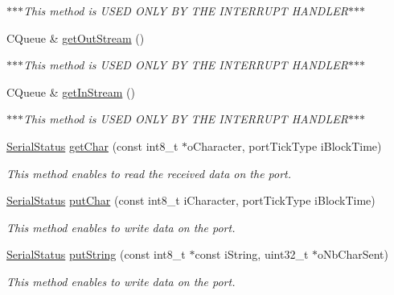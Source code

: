 \begin{DoxyCompactItemize}
\begin{DoxyCompactList}\small\item\em $\ast$$\ast$$\ast$\-This method is \-U\-S\-E\-D \-O\-N\-L\-Y \-B\-Y \-T\-H\-E \-I\-N\-T\-E\-R\-R\-U\-P\-T \-H\-A\-N\-D\-L\-E\-R$\ast$$\ast$$\ast$ \end{DoxyCompactList}\item 
\hypertarget{class_async_serial_port1_ac971fccf2a2885233436f7685ee964cd}{\-C\-Queue \& \hyperlink{class_async_serial_port1_ac971fccf2a2885233436f7685ee964cd}{get\-Out\-Stream} ()}\label{class_async_serial_port1_ac971fccf2a2885233436f7685ee964cd}

\begin{DoxyCompactList}\small\item\em $\ast$$\ast$$\ast$\-This method is \-U\-S\-E\-D \-O\-N\-L\-Y \-B\-Y \-T\-H\-E \-I\-N\-T\-E\-R\-R\-U\-P\-T \-H\-A\-N\-D\-L\-E\-R$\ast$$\ast$$\ast$ \end{DoxyCompactList}\item 
\hypertarget{class_async_serial_port1_a61f0414477f9979a4aae765f9cd2d9e3}{\-C\-Queue \& \hyperlink{class_async_serial_port1_a61f0414477f9979a4aae765f9cd2d9e3}{get\-In\-Stream} ()}\label{class_async_serial_port1_a61f0414477f9979a4aae765f9cd2d9e3}

\begin{DoxyCompactList}\small\item\em $\ast$$\ast$$\ast$\-This method is \-U\-S\-E\-D \-O\-N\-L\-Y \-B\-Y \-T\-H\-E \-I\-N\-T\-E\-R\-R\-U\-P\-T \-H\-A\-N\-D\-L\-E\-R$\ast$$\ast$$\ast$ \end{DoxyCompactList}\item 
\hyperlink{_serial_type_8h_a71c113451bfafdaf5fcabcd807acd480}{\-Serial\-Status} \hyperlink{class_async_serial_port1_abf7bce398cb06b5368f7a617bcbdf857}{get\-Char} (const int8\-\_\-t $\ast$o\-Character, port\-Tick\-Type i\-Block\-Time)
\begin{DoxyCompactList}\small\item\em \-This method enables to read the received data on the port. \end{DoxyCompactList}\item 
\hyperlink{_serial_type_8h_a71c113451bfafdaf5fcabcd807acd480}{\-Serial\-Status} \hyperlink{class_async_serial_port1_a414bdbd17f686e2a31f8109d4492b595}{put\-Char} (const int8\-\_\-t i\-Character, port\-Tick\-Type i\-Block\-Time)
\begin{DoxyCompactList}\small\item\em \-This method enables to write data on the port. \end{DoxyCompactList}\item 
\hyperlink{_serial_type_8h_a71c113451bfafdaf5fcabcd807acd480}{\-Serial\-Status} \hyperlink{class_async_serial_port1_a1f8e0292a566d5a16e993202a6ea9d1b}{put\-String} (const int8\-\_\-t $\ast$const i\-String, uint32\-\_\-t $\ast$o\-Nb\-Char\-Sent)
\begin{DoxyCompactList}\small\item\em \-This method enables to write data on the port. \end{DoxyCompactList}\end{DoxyCompactItemize}

